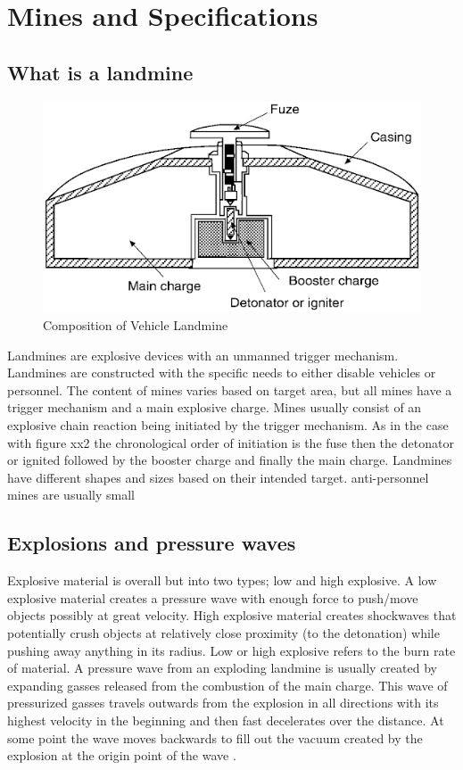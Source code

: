 \chapter{Mines and Specifications}

\section{What is a landmine}

\begin{figure}
\centering
\includegraphics[width=\linewidth]{00 - Images/composition of vehicle landmine.png}
  \caption{Composition of Vehicle Landmine \cite{NAP10071}}
  \label{fig:composition of vehicle landmine}
\end{figure}

Landmines are explosive devices with an unmanned trigger mechanism. Landmines are constructed with the specific needs to either disable vehicles or personnel. The content of mines varies based on target area, but all mines have a trigger mechanism and a main explosive charge. Mines usually consist of an explosive chain reaction being initiated by the trigger mechanism. As in the case with figure xx2 the chronological order of initiation is the fuse then the detonator or ignited followed by the booster charge and finally the main charge. Landmines have different shapes and sizes based on their intended target. anti-personnel mines are usually small

\section{Explosions and pressure waves}

Explosive material is overall but into two types; low and high explosive. A low explosive material creates a pressure wave with enough force to push/move objects possibly at great velocity. High explosive material creates shockwaves that potentially crush objects at relatively close proximity (to the detonation) while pushing away anything in its radius. Low or high explosive refers to the burn rate of material. A pressure wave from an exploding landmine is usually created by expanding gasses released from the combustion of the main charge. This wave of pressurized gasses travels outwards from the explosion in all directions with its highest velocity in the beginning and then fast decelerates over the distance. At some point the wave moves backwards to fill out the vacuum created by the explosion at the origin point of the wave \cite{Siegelbook}.

